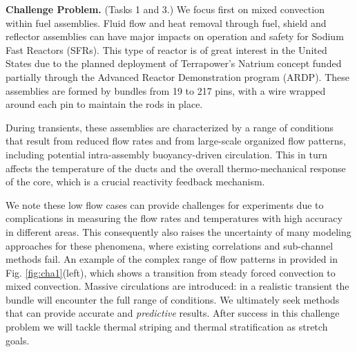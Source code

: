 \noindent \textbf{Challenge Problem.} (Tasks 1 and 3.)
We focus first on mixed convection within fuel assemblies. Fluid flow and heat removal through fuel, shield and reflector assemblies  can
have major impacts on operation and safety for Sodium Fast Reactors (SFRs).
This type of reactor is of great interest in the United States due to the
planned  deployment of Terrapower's Natrium concept funded partially through
the Advanced Reactor Demonstration program (ARDP). These assemblies are formed
by bundles from 19 to 217 pins, with a wire wrapped around each pin to maintain
the rods in place.

During transients, these assemblies are characterized by a range of conditions
that result from reduced flow rates and from large-scale organized flow
patterns, including potential intra-assembly buoyancy-driven circulation. This
in turn affects the temperature of the ducts and the overall thermo-mechanical
response of the core, which is a crucial reactivity feedback mechanism.

We note these low flow cases can provide challenges for experiments due to
complications in measuring the flow rates and temperatures with high accuracy
in different areas. This consequently also raises the uncertainty of many
modeling approaches for these phenomena, where existing correlations and
sub-channel methods fail. An example of the complex range of flow patterns in
provided in Fig. \ref{fig:cha1}(left), which shows a transition from steady forced
convection to mixed convection.  Massive circulations are introduced: in a
realistic transient the bundle will encounter the full range of conditions. We
ultimately seek methods that can provide accurate and \textit{predictive}
results. After success in this challenge problem we will tackle thermal striping and thermal stratification as stretch goals.
